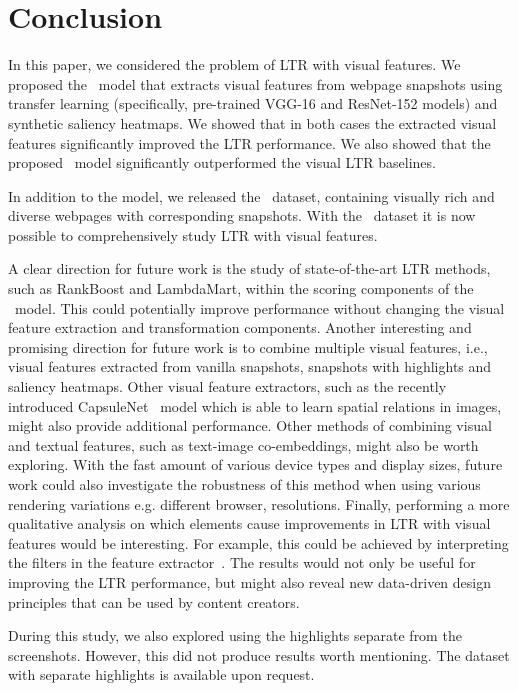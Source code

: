 
\section{Conclusion}
In this paper, we considered the problem of \ac{LTR} with visual features.
We proposed the \modelname~model that extracts visual features from webpage snapshots
using transfer learning (specifically, pre-trained VGG-16 and ResNet-152 models) and synthetic saliency heatmaps.
We showed that in both cases the extracted visual features significantly improved the \ac{LTR} performance.
We also showed that the proposed \modelname~model significantly outperformed the visual \ac{LTR} baselines.

In addition to the model, we released the \datasetname~dataset, containing visually rich and diverse webpages with corresponding snapshots.
With the \datasetname~dataset it is now possible to comprehensively study \ac{LTR} with visual features.

A clear direction for future work is the study of state-of-the-art \ac{LTR} methods, such as RankBoost and LambdaMart, within the scoring components of the \modelname~model.
This could potentially improve performance without changing the visual feature extraction and transformation components.
Another interesting and promising direction for future work is to combine multiple visual features,
i.e., visual features extracted from vanilla snapshots, snapshots with highlights and saliency heatmaps. Other visual feature extractors, such as the recently introduced CapsuleNet~\cite{sabour2017dynamic} model which is able to learn spatial relations in images, might also provide additional performance. Other methods of combining visual and textual features, such as text-image co-embeddings, might also be worth exploring. 
With the fast amount of various device types and display sizes, future work could also investigate the robustness of this method when using various rendering variations e.g. different browser, resolutions. 
Finally, performing a more qualitative analysis on which elements cause improvements in \ac{LTR} with visual features would be interesting. For example, this could be achieved by interpreting the filters in the feature extractor~\cite{olah2018the}. 
The results would not only be useful for improving the \ac{LTR} performance, but might also reveal new data-driven design principles that can be used by content creators. 

During this study, we also explored using the highlights separate from the screenshots. 
However, this did not produce results worth mentioning. 
The dataset with separate highlights is available upon request. 
\fi